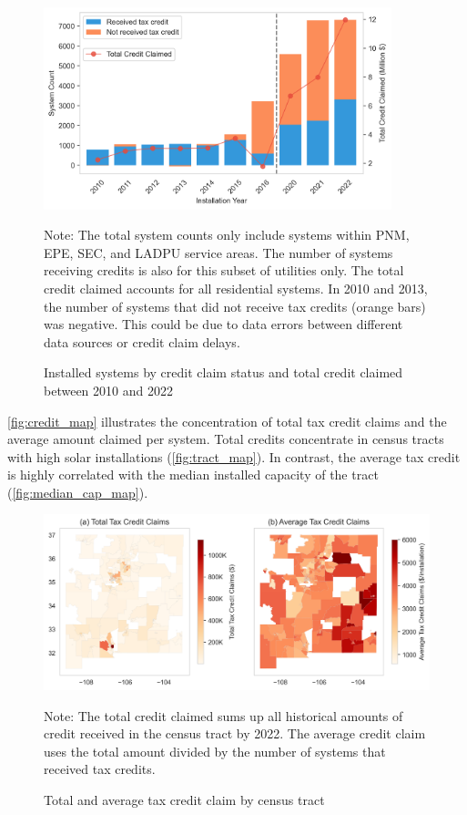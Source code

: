\documentclass[11pt,twoside,letterpaper]{article}
\begin{document}
\begin{figure}[!ht]
    \centering
\includegraphics[width=0.9\textwidth]{figures/credit_claim.png}
    \caption{Installed systems by credit claim status and total credit claimed between 2010 and 2022}
    \label{fig:credit_claim}
      \begin{flushleft}
        \footnotesize Note: The total system counts only include systems within PNM, EPE, SEC, and LADPU service areas. The number of systems receiving credits is also for this subset of utilities only. The total credit claimed accounts for all residential systems. In 2010 and 2013, the number of systems that did not receive tax credits (orange bars) was negative. This could be due to data errors between different data sources or credit claim delays.
    \end{flushleft}
\end{figure}

\autoref{fig:credit_map} illustrates the concentration of total tax credit claims and the average amount claimed per system. Total credits concentrate in census tracts with high solar installations (\autoref{fig:tract_map}). In contrast, the average tax credit is highly correlated with the median installed capacity of the tract (\autoref{fig:median_cap_map}). 

\begin{figure}[!ht]
    \centering
\includegraphics[width=1\textwidth]{figures/credit_claim_maps.png}
    \caption{Total and average tax credit claim by census tract}
    \label{fig:credit_map}
      \begin{flushleft}
        \footnotesize Note: The total credit claimed sums up all historical amounts of credit received in the census tract by 2022. The average credit claim uses the total amount divided by the number of systems that received tax credits.
    \end{flushleft}
\end{figure}
\end{document}
